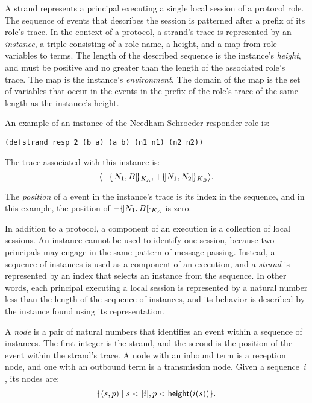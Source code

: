 \documentclass[12pt]{article}
\begin{document}
A strand represents a principal executing a single local
session of a protocol role.  The sequence of events that
describes the session is patterned after a prefix of its role's trace.
In the context of a protocol, a strand's trace is represented by an
\emph{instance}, a triple consisting of a role name, a
height, and a map from role variables to terms.  The length of the
described sequence is the instance's \emph{height}, and
must be positive and no greater than the length of the associated
role's trace.  The map is the instance's
\emph{environment.}  The domain of the map is the
set of variables that occur in the events in the prefix of the
role's trace of the same length as the instance's height.  \iffalse An
instance is in $I=R\times\nat\times(X\rightarrow T)$.  \fi

An example of an instance of the Needham-Schroeder responder role
is:
\begin{center}
\texttt{(defstrand resp 2 (b a) (a b) (n1 n1) (n2 n2))}
\end{center}
The trace associated with this instance is:
$$\langle\mathord -\{\!|N_1, B|\!\}_{K_A}, \mathord +\{\!|N_1,
N_2|\!\}_{K_B}\rangle.$$

The \emph{position} of a event in the
instance's trace is its index in the sequence, and in this example,
the position of $\mathord -\{\!|N_1, B|\!\}_{K_A}$ is zero.

In addition to a protocol, a component of an execution is a collection
of local sessions.  An instance cannot be used to identify one
session, because two principals may engage in the same pattern of
message passing.  Instead, a sequence of instances is used as a
component of an execution, and a \emph{strand} is represented by an
index that selects an instance from the sequence.  In other words,
each principal executing a local session is represented by a natural
number less than the length of the sequence of instances, and its
behavior is described by the instance found using its representation.

A \emph{node} is a pair of natural numbers that identifies
an event within a sequence of instances.  The first integer is
the strand, and the second is the position of the event within
the strand's trace.  A node with an inbound term is a reception
node, and one with an outbound term is a
transmission node.  Given a sequence~$i$, its
nodes are: $$\{(s,p)\mid s<|i|, p<\cn{height}(i(s))\}.$$
\end{document}
